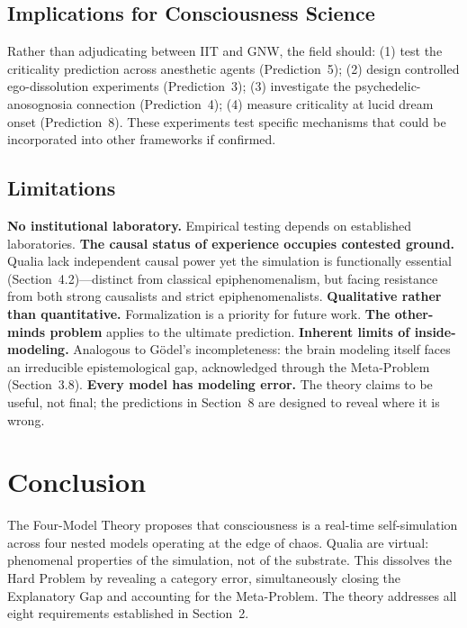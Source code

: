 \documentclass[12pt]{article}
\begin{document}
\subsection{Implications for Consciousness Science}

Rather than adjudicating between IIT and GNW, the field should: (1) test the criticality prediction across anesthetic agents (Prediction~5); (2) design controlled ego-dissolution experiments (Prediction~3); (3) investigate the psychedelic-anosognosia connection (Prediction~4); (4) measure criticality at lucid dream onset (Prediction~8). These experiments test specific mechanisms that could be incorporated into other frameworks if confirmed.


\subsection{Limitations}

\textbf{No institutional laboratory.} Empirical testing depends on established laboratories. \textbf{The causal status of experience occupies contested ground.} Qualia lack independent causal power yet the simulation is functionally essential (Section~4.2)---\hspace{0pt}distinct from classical epiphenomenalism, but facing resistance from both strong causalists and strict epiphenomenalists. \textbf{Qualitative rather than quantitative.} Formalization is a priority for future work. \textbf{The other-minds problem} applies to the ultimate prediction. \textbf{Inherent limits of inside-modeling.} Analogous to G{\"o}del's incompleteness: the brain modeling itself faces an irreducible epistemological gap, acknowledged through the Meta-Problem (Section~3.8). \textbf{Every model has modeling error.} The theory claims to be useful, not final; the predictions in Section~8 are designed to reveal where it is wrong.



\section{Conclusion}

The Four-Model Theory proposes that consciousness is a real-time self-simulation across four nested models operating at the edge of chaos. Qualia are virtual: phenomenal properties of the simulation, not of the substrate. This dissolves the Hard Problem by revealing a category error, simultaneously closing the Explanatory Gap and accounting for the Meta-Problem. The theory addresses all eight requirements established in Section~2.
\end{document}
